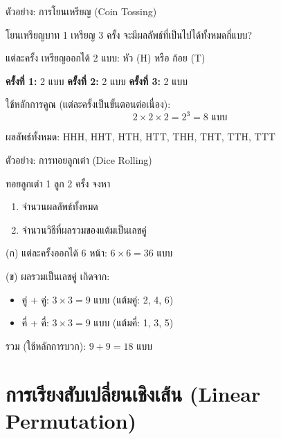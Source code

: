 \documentclass[11pt, aspectratio=169]{beamer}
\begin{document}
\begin{frame}{ตัวอย่าง: การโยนเหรียญ (Coin Tossing)}
  \begin{exambox}[โจทย์]
    โยนเหรียญบาท 1 เหรียญ 3 ครั้ง
    จะมีผลลัพธ์ที่เป็นไปได้ทั้งหมดกี่แบบ?
  \end{exambox}

  \begin{solbox}[วิธีทำ]
    แต่ละครั้ง เหรียญออกได้ 2 แบบ: หัว (H) หรือ ก้อย (T)

    \medskip
    \textbf{ครั้งที่ 1:} 2 แบบ \quad
    \textbf{ครั้งที่ 2:} 2 แบบ \quad
    \textbf{ครั้งที่ 3:} 2 แบบ

    \medskip
    ใช้หลักการคูณ (แต่ละครั้งเป็นขั้นตอนต่อเนื่อง):
    \[
      2 \times 2 \times 2 = 2^3 = 8 \text{ แบบ}
    \]

    \medskip
    ผลลัพธ์ทั้งหมด: HHH, HHT, HTH, HTT, THH, THT, TTH, TTT
  \end{solbox}
\end{frame}

\begin{frame}{ตัวอย่าง: การทอยลูกเต๋า (Dice Rolling)}
  \begin{exambox}[โจทย์]
    ทอยลูกเต๋า 1 ลูก 2 ครั้ง จงหา
    \begin{enumerate}
      \item[(ก)] จำนวนผลลัพธ์ทั้งหมด
      \item[(ข)] จำนวนวิธีที่ผลรวมของแต้มเป็นเลขคู่
    \end{enumerate}
  \end{exambox}

  \begin{solbox}[วิธีทำ]
    (ก) แต่ละครั้งออกได้ 6 หน้า: \quad $6 \times 6 = 36$ แบบ

    \medskip
    (ข) ผลรวมเป็นเลขคู่ เกิดจาก:
    \begin{itemize}
      \item คู่ + คู่: $3 \times 3 = 9$ แบบ \quad (แต้มคู่: 2, 4, 6)
      \item คี่ + คี่: $3 \times 3 = 9$ แบบ \quad (แต้มคี่: 1, 3, 5)
    \end{itemize}
    รวม (ใช้หลักการบวก): $9 + 9 = 18$ แบบ
  \end{solbox}
\end{frame}

\section{การเรียงสับเปลี่ยนเชิงเส้น (Linear Permutation)}
\end{document}
